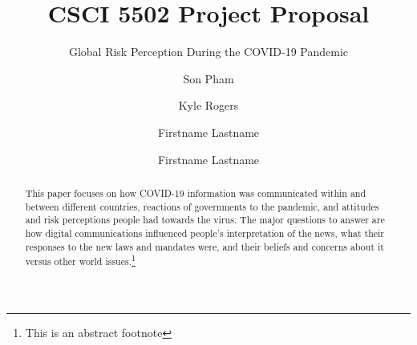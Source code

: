 \documentclass[11pt,sigconf]{acmart}
\begin{document}
\title{CSCI 5502 Project Proposal}
\subtitle{Global Risk Perception During the COVID-19 Pandemic}

\author{Son Pham}

\author{Kyle Rogers}

\author{Firstname Lastname}

\author{Firstname Lastname}


\renewcommand{\shortauthors}{S. Pham et al.}


\begin{abstract}
This paper focuses on how COVID-19 information was communicated within and between different countries, reactions of governments to the pandemic, and attitudes and risk perceptions people had towards the virus. The major questions to answer are how digital communications influenced people’s interpretation of the news, what their responses to the new laws and mandates were, and their beliefs and concerns about it versus other world issues.\footnote{This is an abstract footnote}
\end{abstract}
\end{document}
